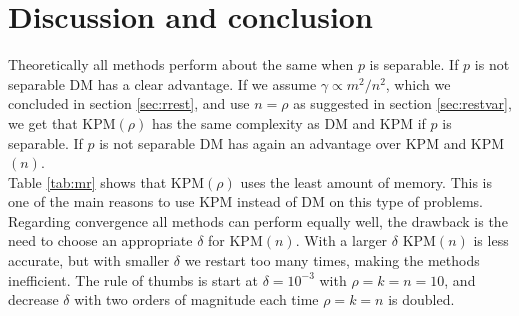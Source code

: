 \chapter{Discussion and conclusion}%
Theoretically all methods perform about the same when $p$ is separable. If $p$ is not separable DM has a clear advantage. If we assume $\gamma \propto m^2/n^2$, which we concluded in section \ref{sec:rrest}, and use $n = \rho$ as suggested in section \ref{sec:restvar}, we get that KPM$(\rho)$ has the same complexity as DM and KPM if $p$ is separable. If $p$ is not separable DM has again an advantage over KPM and KPM$(n)$. \\

Table \ref{tab:mr} shows that KPM$(\rho)$ uses the least amount of memory. This is one of the main reasons to use KPM instead of DM on this type of problems. \\


Regarding convergence all methods can perform equally well, the drawback is the need to choose an appropriate $\delta$ for KPM$(n)$. With a larger $\delta$ KPM$(n)$ is less accurate, but with smaller $\delta$ we restart too many times, making the methods inefficient. The rule of thumbs is start at $\delta=10^{-3}$ with $\rho = k = n = 10$, and decrease $\delta$ with two orders of magnitude each time $\rho = k = n$ is doubled. \\

